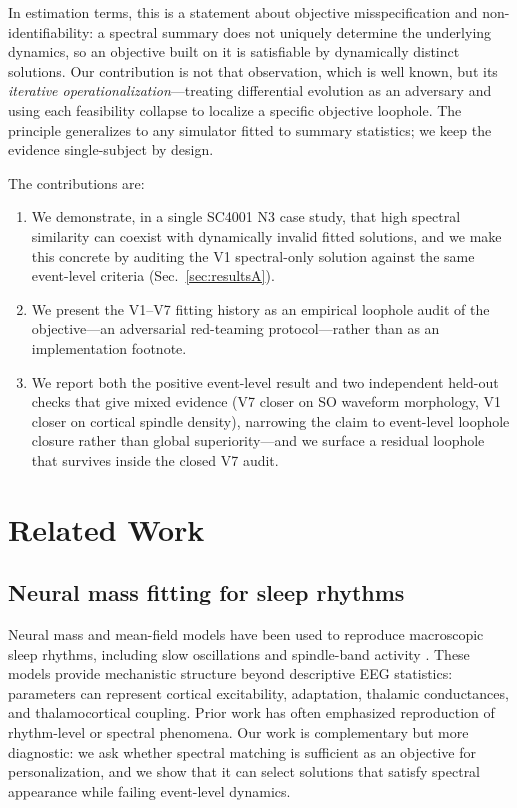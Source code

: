 \documentclass[conference]{IEEEtran}
\begin{document}
In estimation terms, this is a statement about objective misspecification and
non-identifiability: a spectral summary does not uniquely determine the
underlying dynamics, so an objective built on it is satisfiable by dynamically
distinct solutions. Our contribution is not that observation, which is well
known, but its \emph{iterative operationalization}---treating differential
evolution as an adversary and using each feasibility collapse to localize a
specific objective loophole. The principle generalizes to any simulator fitted
to summary statistics; we keep the evidence single-subject by design.

The contributions are:
\begin{enumerate}
\item We demonstrate, in a single SC4001 N3 case study, that high spectral
similarity can coexist with dynamically invalid fitted solutions, and we make
this concrete by auditing the V1 spectral-only solution against the same
event-level criteria (Sec.~\ref{sec:resultsA}).
\item We present the V1--V7 fitting history as an empirical loophole audit of
the objective---an adversarial red-teaming protocol---rather than as an
implementation footnote.
\item We report both the positive event-level result and two independent
held-out checks that give mixed evidence (V7 closer on SO waveform morphology,
V1 closer on cortical spindle density), narrowing the claim to event-level
loophole closure rather than global superiority---and we surface a residual
loophole that survives inside the closed V7 audit.
\end{enumerate}

\section{Related Work}
\subsection{Neural mass fitting for sleep rhythms}
Neural mass and mean-field models have been used to reproduce macroscopic sleep
rhythms, including slow oscillations and spindle-band activity
\cite{cakan2023,jajcay2022,robinson2002}. These models provide mechanistic
structure beyond descriptive EEG statistics: parameters can represent cortical
excitability, adaptation, thalamic conductances, and thalamocortical coupling.
Prior work has often emphasized reproduction of rhythm-level or spectral
phenomena. Our work is complementary but more diagnostic: we ask whether
spectral matching is sufficient as an objective for personalization, and we
show that it can select solutions that satisfy spectral appearance while
failing event-level dynamics.
\end{document}

